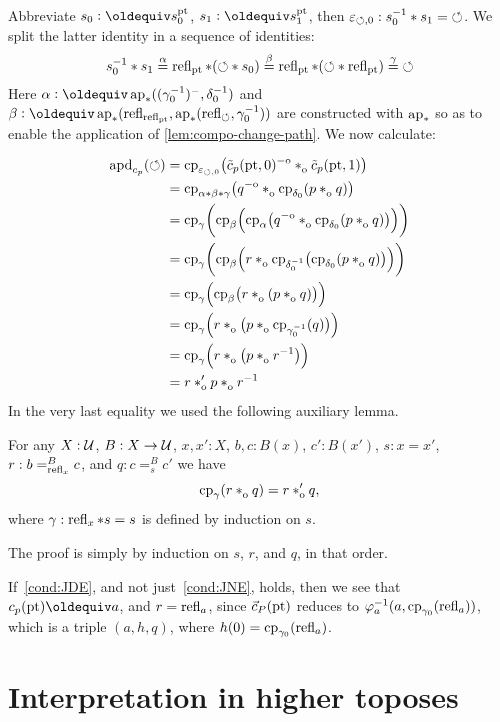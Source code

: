 \documentclass[a4paper,12pt]{amsart}
\begin{document}
Abbreviate $s_0 \defeq s^\pt_0$, $s_1 \defeq s^\pt_1$,
then $\varepsilon_{{\circlearrowleft},0} : s_0^{-1} * s_1 = {{\circlearrowleft}}$.
We split the latter identity in a sequence of identities:
\[
s_0^{-1} * s_1 \stackrel{\alpha}{=}
\mathop{{\mathrm{refl}}_{{\mathord{\mathrm{pt}}}}}*({\circlearrowleft}* s_0) \stackrel{\beta}{=}
\mathop{{\mathrm{refl}}_{{\mathord{\mathrm{pt}}}}}*({\circlearrowleft}*\mathop{{\mathrm{refl}}_{{\mathord{\mathrm{pt}}}}})\stackrel{\gamma}{=} {{\circlearrowleft}}
\]
Here $\alpha\defeq\apc((\gamma_0^{-1})^-,\delta_0^{-1})$ and
$\beta\defeq\apc(\refl{\refl{\pt}},\apc(\refl{\Zloop},\gamma_0^{-1}))$ are constructed with $\mathop{\mathrm{ap}_{*}}$ so as to
enable the application of \cref{lem:compo-change-path}.
We now calculate:

\begin{align*}
  \apd{c_p}(\Zloop)
  &= \cp{\varepsilon_{\Zloop,0}}
    \bigl(\tilde c_p(\pt,0)\invo \cto \tilde c_p(\pt,1)\bigr) \\
  &= \cp{\alpha\ct\beta\ct\gamma}
    \bigl(q\invo \cto \cp{\delta_0}(p \cto q)\bigr) \\
  &= \cp{\gamma}\biggl(\cp{\beta}\Bigl(\cp{\alpha}
    \bigl(q\invo \cto \cp{\delta_0}(p \cto q)\bigr)\Bigr)\biggr) \\
  &= \cp{\gamma}\biggl(\cp{\beta}\Bigl(
    r \cto \cp{\delta_0^{-1}}\bigl(\cp{\delta_0}(p \cto q)\bigr)
    \Bigr)\biggr) \\
  &= \cp{\gamma}\Bigl(\cp{\beta}\bigl(
    r \cto (p \cto q)\bigr)\Bigr) \\
  &= \cp{\gamma}\Bigl(r \cto \bigl(p \cto \cp{\gamma_0^{-1}}(q)\bigl)\Bigr) \\
  &= \cp{\gamma}\Bigl(r \cto \bigl(p \cto r^{-1}\bigl)\Bigr) \\
  &= r \ctop p \cto r^{-1}
\end{align*}
In the very last equality we used the following auxiliary lemma.
\begin{lemma}
  For any $X : \mathcal{U}$, $B : X \to \mathcal{U}$, $x,x':X$, $b,c:B(x)$,
  $c':B(x')$, $s : x=x'$, $r : b =^B_{\mathop{{\mathrm{refl}}_{x}}} c$, and $q : c =^B_s c'$
  we have
  \[
    \cp{\gamma}(r \cto q) = r \ctop q,
  \]
  where $\gamma : \mathop{{\mathrm{refl}}_{x}} * s = s$ is defined by induction on $s$.
\end{lemma}
The proof is simply by induction on $s$, $r$, and $q$, in that order.

If~\cref{cond:JDE}, and not just~\cref{cond:JNE}, holds,
then we see that $c_p(\pt)\jdeq a$, and $r=\mathop{{\mathrm{refl}}_{a}}$,
since $\vec c_P({\mathord{\mathrm{pt}}})$ reduces to
$\varphi_{a}^{-1}(a,\mathrm{cp}_{\gamma_0}(\mathop{{\mathrm{refl}}_{a}}))$,
which is a triple $(a,h,q)$, where $h(0)=\mathrm{cp}_{\gamma_0}(\mathop{{\mathrm{refl}}_{a}})$.

\section{Interpretation in higher toposes}
\label{sec:topos}
\end{document}
